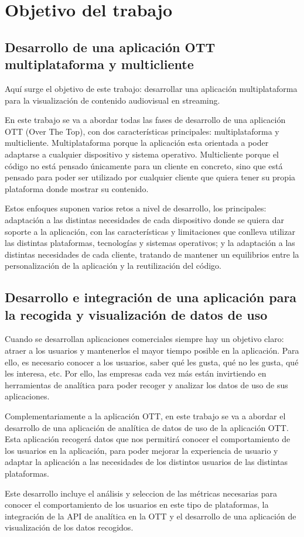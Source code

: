 \section{Objetivo del trabajo}
\label{sec:objetivo}
\subsection{Desarrollo de una aplicación OTT multiplataforma y multicliente}
\label{sec:PlataformaOTT_introduccion}

Aquí surge el objetivo de este trabajo: desarrollar una aplicación multiplataforma para la visualización de contenido
audiovisual en streaming.

En este trabajo se va a abordar todas las fases de desarrollo de una aplicación OTT (Over The Top), con dos características
principales: multiplataforma y multicliente. Multiplataforma porque la aplicación esta orientada a poder adaptarse a cualquier 
dispositivo y sistema operativo. Multicliente porque el código no está pensado únicamente para un cliente en concreto,
sino que está pensado para poder ser utilizado por cualquier cliente que quiera tener su propia plataforma donde mostrar
su contenido.

Estos enfoques suponen varios retos a nivel de desarrollo, los principales: adaptación a las distintas necesidades de cada dispositivo 
donde se quiera dar soporte a la aplicación, con las características y limitaciones que conlleva utilizar las distintas plataformas, tecnologías
y sistemas operativos; y la adaptación a las distintas necesidades de cada cliente, tratando de mantener un equilibrios entre la personalización
de la aplicación y la reutilización del código. 


\subsection{Desarrollo e integración de una aplicación para la recogida y visualización de datos de uso}
\label{sec:Analitica_introduccion}

Cuando se desarrollan aplicaciones comerciales siempre hay un objetivo claro: atraer a los usuarios y mantenerlos el mayor tiempo posible
en la aplicación. Para ello, es necesario conocer a los usuarios, saber qué les gusta, qué no les gusta, qué les interesa, etc. Por ello,
las empresas cada vez más están invirtiendo en herramientas de analítica para poder recoger y analizar los datos de uso de sus aplicaciones.

Complementariamente a la aplicación OTT, en este trabajo se va a abordar el desarrollo de una aplicación de analítica de datos de uso de la
aplicación OTT. Esta aplicación recogerá datos que nos permitirá conocer el comportamiento de los usuarios en la aplicación, para poder
mejorar la experiencia de usuario y adaptar la aplicación a las necesidades de los distintos usuarios de las distintas plataformas.

Este desarrollo incluye el análisis y seleccion de las métricas necesarias para conocer el comportamiento de los usuarios en este tipo de 
plataformas, la integración de la API de analítica en la OTT y el desarrollo de una aplicación de visualización de los datos recogidos.
